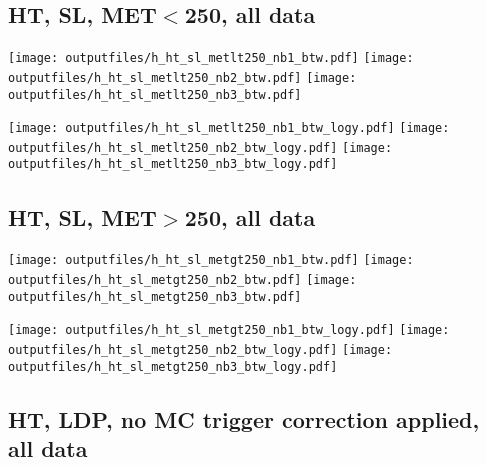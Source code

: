\documentclass[11pt]{article}
\begin{document}


    \subsection{ HT, SL, MET$<$250, all data}

    \noindent
     \texttt{[image: outputfiles/h\_ht\_sl\_metlt250\_nb1\_btw.pdf]}
     \texttt{[image: outputfiles/h\_ht\_sl\_metlt250\_nb2\_btw.pdf]}
     \texttt{[image: outputfiles/h\_ht\_sl\_metlt250\_nb3\_btw.pdf]}

    \noindent
     \texttt{[image: outputfiles/h\_ht\_sl\_metlt250\_nb1\_btw\_logy.pdf]}
     \texttt{[image: outputfiles/h\_ht\_sl\_metlt250\_nb2\_btw\_logy.pdf]}
     \texttt{[image: outputfiles/h\_ht\_sl\_metlt250\_nb3\_btw\_logy.pdf]}


    \subsection{ HT, SL, MET$>$250, all data}

    \noindent
     \texttt{[image: outputfiles/h\_ht\_sl\_metgt250\_nb1\_btw.pdf]}
     \texttt{[image: outputfiles/h\_ht\_sl\_metgt250\_nb2\_btw.pdf]}
     \texttt{[image: outputfiles/h\_ht\_sl\_metgt250\_nb3\_btw.pdf]}

    \noindent
     \texttt{[image: outputfiles/h\_ht\_sl\_metgt250\_nb1\_btw\_logy.pdf]}
     \texttt{[image: outputfiles/h\_ht\_sl\_metgt250\_nb2\_btw\_logy.pdf]}
     \texttt{[image: outputfiles/h\_ht\_sl\_metgt250\_nb3\_btw\_logy.pdf]}











     \subsection{ HT, LDP, no MC trigger correction applied, all data}
\end{document}
